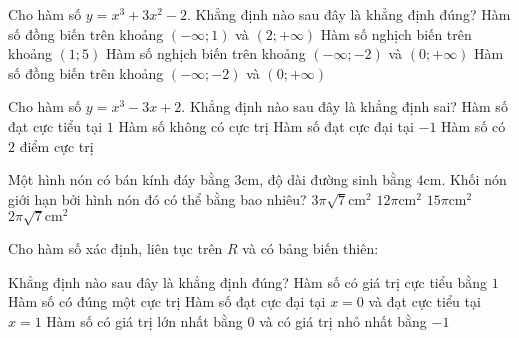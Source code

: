 \begin{ex}%
Cho hàm số $y=x^3+3x^2-2$. Khẳng định nào sau đây là khẳng định đúng?
\choice 
{Hàm số đồng biến trên khoảng $(-\infty;1)$ và $(2;+\infty)$}
{Hàm số nghịch biến trên khoảng $(1;5)$}
{\True Hàm số nghịch biến trên khoảng $(-\infty;-2)$ và $(0;+\infty)$}
{Hàm số đồng biến trên khoảng $(-\infty;-2)$ và $(0;+\infty)$}
\end{ex}
\begin{ex}%
Cho hàm số $y=x^3-3x+2$. Khẳng định nào sau đây là khẳng định sai?
\choice 
{\True Hàm số đạt cực tiểu tại $1$}
{Hàm số không có cực trị}
{Hàm số đạt cực đại tại $-1$}
{Hàm số có $2$ điểm cực trị}
\end{ex}
\begin{ex}%
Một hình nón có bán kính đáy bằng $3$cm, độ dài đường sinh bằng $4$cm. Khối nón giới hạn bởi hình nón đó có thể bằng bao nhiêu?
\choice 
{\True $3\pi\sqrt{7}\textrm{cm}^2$}
{$12\pi\textrm{cm}^2$}
{$15\pi\textrm{cm}^2$}
{$2\pi\sqrt{7}\textrm{cm}^2$}
\end{ex}
\begin{ex}%
Cho hàm số xác định, liên tục trên $R$ và có bảng biến thiên:
\begin{center}
\end{center}
Khẳng định nào sau đây là khẳng định đúng?
\choice 
{Hàm số có giá trị cực tiểu bằng $1$}
{Hàm số có đúng một cực trị}
{Hàm số đạt cực đại tại $x=0$ và đạt cực tiểu tại $x=1$}
{\True Hàm số có giá trị lớn nhất bằng $0$ và có giá trị nhỏ nhất bằng $-1$}
\end{ex}
\begin{ex}%
{}

\end{ex}
